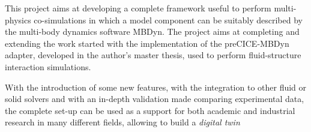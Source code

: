 This project aims at developing a complete framework useful to perform multi-physics co-simulations in which a model component can be suitably described by the multi-body dynamics software MBDyn.  
The project aims at completing and extending the work started with the implementation of the preCICE-MBDyn adapter, developed in the author's master thesis, used to perform fluid-structure interaction simulations.

With the introduction of some new features, with the integration to other fluid or solid solvers and with an in-depth validation made comparing experimental data, the complete set-up can be used as a support for both academic and industrial research in many different fields, allowing to build a \textit{digital twin} 